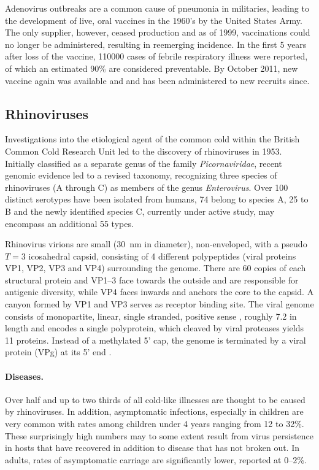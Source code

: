 Adenovirus outbreaks are a common cause of pneumonia in militaries, leading to the development of live, oral vaccines in the 1960's by the United States Army. The only supplier, however, ceased production and as of 1999, vaccinations could no longer be administered, resulting in reemerging incidence. In the first 5 years after loss of the vaccine, 110000 cases of febrile respiratory illness were reported, of which an estimated 90\% are considered preventable. By October 2011, new vaccine again was available and and has been administered to new recruits since.

\subsection{Rhinoviruses}
Investigations into the etiological agent of the common cold within the British Common Cold Research Unit led to the discovery of rhinoviruses in 1953. Initially classified as a separate genus of the family \textit{Picornaviridae}, recent genomic evidence led to a revised taxonomy, recognizing three species of rhinoviruses (A through C) as members of the genus \textit{Enterovirus}. Over 100 distinct serotypes have been isolated from humans, 74 belong to species A, 25 to B and the newly identified species C, currently under active study, may encompass an additional 55 types.

Rhinovirus virions are small (\SI{30}{\nano\meter} in diameter), non-enveloped, with a pseudo $T=3$ icosahedral capsid, consisting of 4 different polypeptides (viral proteins VP1, VP2, VP3 and VP4) surrounding the  genome. There are 60 copies of each structural protein and VP1--3 face towards the outside and are responsible for antigenic diversity, while VP4 faces inwards and anchors the  core to the capsid. A canyon formed by VP1 and VP3 serves as receptor binding site. The viral genome consists of monopartite, linear, single stranded, positive sense , roughly \SI{7.2}{\kilobase} in length and encodes a single polyprotein, which cleaved by viral proteases yields 11 proteins. Instead of a methylated 5' cap, the  genome is terminated by a viral protein (VPg) at its 5' end \citep{Jacobs2013}.

\paragraph{Diseases.}
Over half and up to two thirds of all cold-like illnesses are thought to be caused by rhinoviruses. In addition, asymptomatic infections, especially in children are very common with rates among children under 4 years ranging from 12 to 32\%. These surprisingly high numbers may to some extent result from virus persistence in hosts that have recovered in addition to disease that has not broken out. In adults, rates of asymptomatic carriage are significantly lower, reported at 0--2\%.

